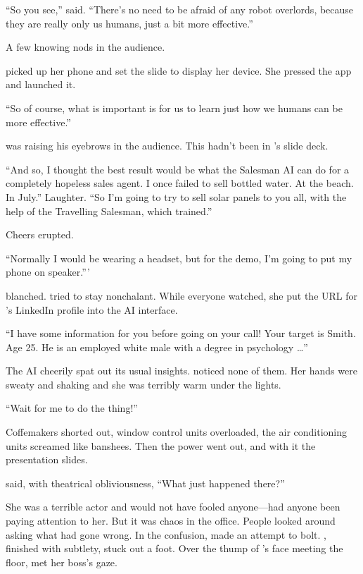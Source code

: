 ``So you see,'' {\protag} said. ``There's no need to be afraid of any robot overlords, because they are really only us humans, just a bit more effective.''

A few knowing nods in the audience.

{\protag} picked up her phone and set the slide to display her device. She pressed the app and launched it.

``So of course, what is important is for us to learn just how we humans can be more effective.''

\Boss{} was raising his eyebrows in the audience. This hadn't been in {\protag}'s slide deck.

``And so, I thought the best result would be what the Salesman AI can do for a completely hopeless sales agent. I once failed to sell bottled water. At the beach. In July.'' Laughter. ``So I'm going to try to sell solar panels to you all, with the help of the Travelling Salesman, which \energyJerk{} trained.''

Cheers erupted.

``Normally I would be wearing a headset, but for the demo, I'm going to put my phone on speaker.'''

\energyJerk{} blanched. {\protag} tried to stay nonchalant. While everyone watched, she put the URL for \energyJerk{}'s LinkedIn profile into the AI interface.

``I have some information for you before going on your call! Your target is \energyJerk{} Smith. Age 25. He is an employed white male with a degree in psychology \dots''

The AI cheerily spat out its usual insights. {\protag} noticed none of them. Her hands were sweaty and shaking and she was terribly warm under the lights.

``Wait for me to do the thing!''

Coffemakers shorted out, window control units overloaded, the air conditioning units screamed like banshees. Then the power went out, and with it the presentation slides.

{\protag} said, with theatrical obliviousness, ``What just happened there?''

She was a terrible actor and would not have fooled anyone---had anyone been paying attention to her. But it was chaos in the office. People looked around asking what had gone wrong. In the confusion, \energyJerk{} made an attempt to bolt. {\protag}, finished with subtlety, stuck out a foot. Over the thump of \energyJerk{}'s face meeting the floor, {\protag} met her boss's gaze.

